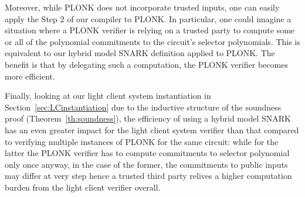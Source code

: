 \noindent Moreover, while PLONK does not incorporate trusted inputs, one can easily apply the Step 2 of our compiler to PLONK. In particular, one could imagine a situation 
where a PLONK verifier is relying on a trusted party to compute some or all of the polynomial commitments to the circuit's selector polynomials. This is equivalent to our hybrid 
model SNARK definition applied to PLONK. The benefit is that by delegating such a computation, the PLONK verifier becomes more efficient. \\ %


\begin{comment}
The next paragraph should be commented out if we do not include in the submission the light client model instantiation section, i.e., section 5.3 on eprint.
\end{comment}

\noindent Finally, looking at our light client system instantiation in Section~\ref{sec:LCinstantiation} due to the inductive structure of the soundness proof (Theorem~\ref{th:soundness}), 
the efficiency of using a hybrid model SNARK has an even greater impact for the light client system verifier than that compared to verifying multiple instances of PLONK for the same circuit:
while for the latter the PLONK verifier has to compute commitments to selector polynomial only once anyway, in the case of the former, the commitments to public inputs may differ 
at very step hence a trusted third party relives a higher computation burden from the light client verifier overall. 


